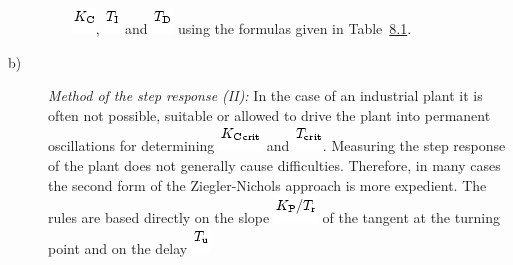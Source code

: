 \documentclass[]{article}
\begin{document}
\begin{description}
\begin{enumerate}
  \includegraphics[width=0.25000in,height=0.27083in]{./Empirical tuning rules according to Ziegler and Nichols_files/img1108.png},
  \includegraphics[width=0.16667in,height=0.27083in]{./Empirical tuning rules according to Ziegler and Nichols_files/img589.png}
  and
  \includegraphics[width=0.21875in,height=0.27083in]{./Empirical tuning rules according to Ziegler and Nichols_files/img1193.png}
  using the formulas given in
  Table~\href{http://www.atp.ruhr-uni-bochum.de/rt1/syscontrol/node64.html\#tab:8.2.8}{8.1}.
\end{enumerate}
\item[b)]
\emph{\protect\hypertarget{16295}{}{}Method of the step response (II):}
In the case of an industrial plant it is often not possible, suitable or
allowed to drive the plant into \protect\hypertarget{16296}{}{}permanent
oscillations for determining
\includegraphics[width=0.44792in,height=0.27083in]{./Empirical tuning rules according to Ziegler and Nichols_files/img1246.png}
and
\includegraphics[width=0.30208in,height=0.27083in]{./Empirical tuning rules according to Ziegler and Nichols_files/img1247.png}.
Measuring the \protect\hypertarget{16299}{}{}step response of the plant
does not generally cause difficulties. Therefore, in many cases the
second form of the Ziegler-Nichols approach is more expedient. The rules
are based directly on the slope
\includegraphics[width=0.45833in,height=0.29167in]{./Empirical tuning rules according to Ziegler and Nichols_files/img1248.png}
of the tangent at the turning point and on the delay
\includegraphics[width=0.18750in,height=0.27083in]{./Empirical tuning rules according to Ziegler and Nichols_files/img64.png}

\end{description}
\end{document}
